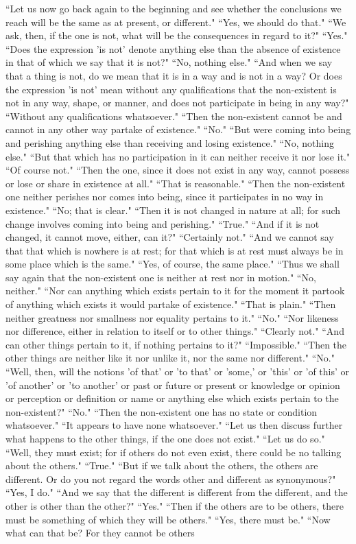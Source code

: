 \documentclass[letterpaper,12pt]{article}
\newcommand{\stephpag}[1]{\marginnote{\small\itshape\fontfamily{ppl}\selectfont #1}}
\begin{document}
``Let us now go back again to the beginning and see whether the conclusions we reach will be the same as at present, or different." ``Yes, we should do that." ``We ask, then, if the one is not, \stephpag{c} what will be the consequences in regard to it?" ``Yes." ``Does the expression 'is not' denote anything else than the absence of existence in that of which we say that it is not?" ``No, nothing else." ``And when we say that a thing is not, do we mean that it is in a way and is not in a way? Or does the expression 'is not' mean without any qualifications that the non-existent is not in any way, shape, or manner, and does not participate in being in any way?" ``Without any qualifications whatsoever." ``Then the non-existent cannot be and cannot in any other way partake of existence." \stephpag{d} ``No." ``But were coming into being and perishing anything else than receiving and losing existence." ``No, nothing else." ``But that which has no participation in it can neither receive it nor lose it." ``Of course not." ``Then the one, since it does not exist in any way, cannot possess or lose or share in existence at all." ``That is reasonable." ``Then the non-existent one neither perishes nor comes into being, since it participates in no way in existence." ``No; that is clear." ``Then it is not changed in nature at all; \stephpag{e} for such change involves coming into being and perishing." ``True." ``And if it is not changed, it cannot move, either, can it?" ``Certainly not." ``And we cannot say that that which is nowhere is at rest; for that which is at rest must always be in some place which is the same." ``Yes, of course, the same place." ``Thus we shall say again that the non-existent one is neither at rest nor in motion." ``No, neither." ``Nor can anything which exists pertain to it for the moment it partook of anything which exists it would partake of existence." \stephpag{164 a} ``That is plain." ``Then neither greatness nor smallness nor equality pertains to it." ``No." ``Nor likeness nor difference, either in relation to itself or to other things." ``Clearly not." ``And can other things pertain to it, if nothing pertains to it?" ``Impossible." ``Then the other things are neither like it nor unlike it, nor the same nor different." ``No." ``Well, then, will the notions 'of that' or 'to that' or 'some,' or 'this' or 'of this' \stephpag{b} or 'of another' or 'to another' or past or future or present or knowledge or opinion or perception or definition or name or anything else which exists pertain to the non-existent?" ``No." ``Then the non-existent one has no state or condition whatsoever." ``It appears to have none whatsoever." ``Let us then discuss further what happens to the other things, if the one does not exist." ``Let us do so." ``Well, they must exist; for if others do not even exist, there could be no talking about the others." ``True." ``But if we talk about the others, the others are different. Or do you not regard the words other and different as synonymous?" \stephpag{c} ``Yes, I do." ``And we say that the different is different from the different, and the other is other than the other?" ``Yes." ``Then if the others are to be others, there must be something of which they will be others." ``Yes, there must be." ``Now what can that be? For they cannot be others 
\end{document}
